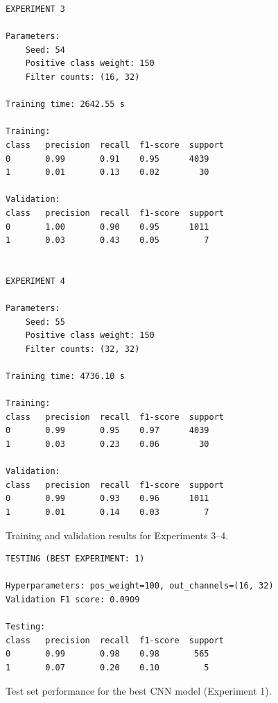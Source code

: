 \documentclass[conference]{IEEEtran}
\begin{document}
\begin{figure}[t]
\centering
\footnotesize

\begin{verbatim}
EXPERIMENT 3

Parameters:
    Seed: 54
    Positive class weight: 150
    Filter counts: (16, 32)

Training time: 2642.55 s

Training:
class   precision  recall  f1-score  support
0       0.99       0.91    0.95      4039
1       0.01       0.13    0.02        30

Validation:
class   precision  recall  f1-score  support
0       1.00       0.90    0.95      1011
1       0.03       0.43    0.05         7


EXPERIMENT 4

Parameters:
    Seed: 55
    Positive class weight: 150
    Filter counts: (32, 32)

Training time: 4736.10 s

Training:
class   precision  recall  f1-score  support
0       0.99       0.95    0.97      4039
1       0.03       0.23    0.06        30

Validation:
class   precision  recall  f1-score  support
0       0.99       0.93    0.96      1011
1       0.01       0.14    0.03         7
\end{verbatim}

\caption{Training and validation results for Experiments 3–4.}
\label{fig:experiments_train_val_34}
\end{figure}

\begin{figure}[t]
\centering
\footnotesize

\begin{verbatim}
TESTING (BEST EXPERIMENT: 1)

Hyperparameters: pos_weight=100, out_channels=(16, 32)
Validation F1 score: 0.0909

Testing:
class   precision  recall  f1-score  support
0       0.99       0.98    0.98       565
1       0.07       0.20    0.10         5
\end{verbatim}

\caption{Test set performance for the best CNN model (Experiment 1).}
\label{fig:test_results}
\end{figure}
\end{document}
